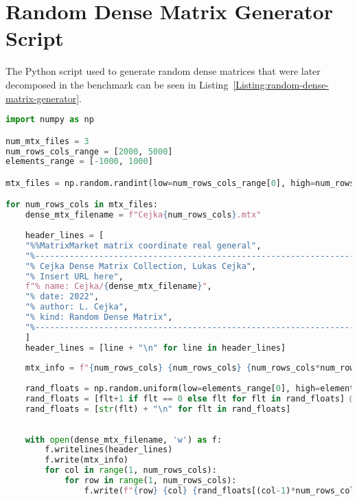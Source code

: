 \newpage 									%
\appendix 								 	%


\chapter{Random Dense Matrix Generator Script}\label{Attachment:random-dense-matrix-generator}
The Python script used to generate random dense matrices that were later decomposed in the benchmark can be seen in Listing~\ref{Listing:random-dense-matrix-generator}.
\begin{lstlisting}[language=Python,caption={Python script for generating random dense matrices in the \emph{SuitSparse Matrix Collection} \cite{Davis2011} format. On line~\ref{Line:eliminate-zeros-from-dense-matrix} it can be seen that any zeros were incremented which was done to assure that the matrices produced would be both strongly regular and composed only of nonzero elements.},label={Listing:random-dense-matrix-generator},escapechar=@]
import numpy as np

num_mtx_files = 3
num_rows_cols_range = [2000, 5000]
elements_range = [-1000, 1000]

mtx_files = np.random.randint(low=num_rows_cols_range[0], high=num_rows_cols_range[1], size=num_mtx_files)

for num_rows_cols in mtx_files:
	dense_mtx_filename = f"Cejka{num_rows_cols}.mtx"
	
	header_lines = [
	"%%MatrixMarket matrix coordinate real general",
	"%----------------------------------------------------------------------------",
	"% Cejka Dense Matrix Collection, Lukas Cejka",
	"% Insert URL here",
	f"% name: Cejka/{dense_mtx_filename}",
	"% date: 2022",
	"% author: L. Cejka",
	"% kind: Random Dense Matrix",
	"%----------------------------------------------------------------------------",
	]
	header_lines = [line + "\n" for line in header_lines]
	
	mtx_info = f"{num_rows_cols} {num_rows_cols} {num_rows_cols*num_rows_cols}\n"
	
	rand_floats = np.random.uniform(low=elements_range[0], high=elements_range[1], size=(num_rows_cols*num_rows_cols))
	rand_floats = [flt+1 if flt == 0 else flt for flt in rand_floats] @\label{Line:eliminate-zeros-from-dense-matrix}@
	rand_floats = [str(flt) + "\n" for flt in rand_floats]
	
	
	with open(dense_mtx_filename, 'w') as f:
		f.writelines(header_lines)
		f.write(mtx_info)
		for col in range(1, num_rows_cols):
			for row in range(1, num_rows_cols):
				f.write(f"{row} {col} {rand_floats[(col-1)*num_rows_cols + row - 1]}")
\end{lstlisting}